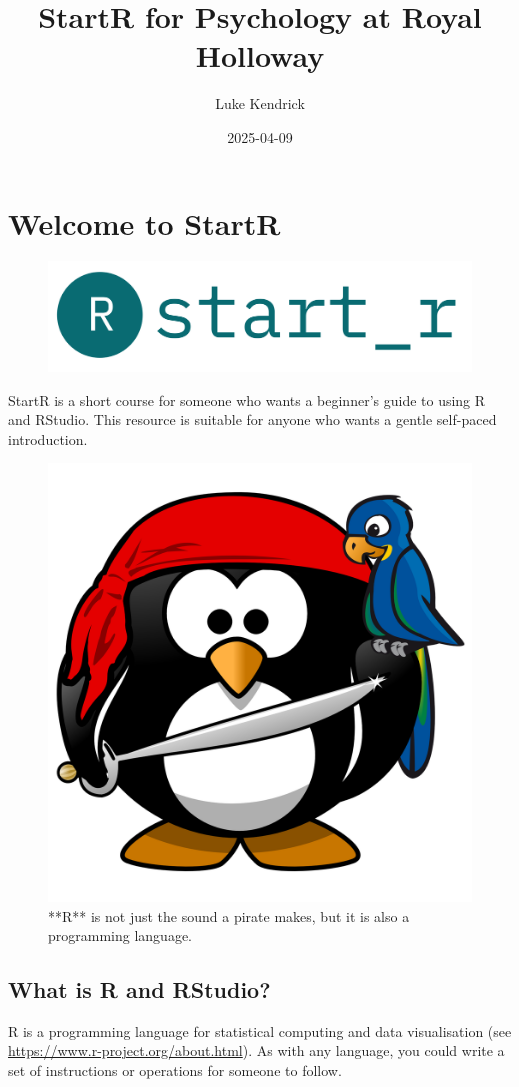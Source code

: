 \documentclass[
]{book}
\title{StartR for Psychology at Royal Holloway}
\author{Luke Kendrick}
\date{2025-04-09}
\let\oldsection\section
\renewcommand{\section}{\needspace{5\baselineskip}\oldsection}
\begin{document}
\maketitle

{
\setcounter{tocdepth}{1}
\tableofcontents
}
\chapter{Welcome to StartR}\label{welcome-to-startr}

\begin{figure}

{\centering \includegraphics[width=0.5\linewidth]{images/startr} 

}

\caption{ }\label{fig:fig}
\end{figure}

StartR is a short course for someone who wants a beginner's guide to using R and RStudio. This resource is suitable for anyone who wants a gentle self-paced introduction.

\begin{figure}

{\centering \includegraphics[width=0.25\linewidth]{images/pirate_spaced} 

}

\caption{**R** is not just the sound a pirate makes, but it is also a programming language.}\label{fig:fig1}
\end{figure}

\section{What is R and RStudio?}\label{what-is-r-and-rstudio}

R is a programming language for statistical computing and data visualisation (see \url{https://www.r-project.org/about.html}). As with any language, you could write a set of instructions or operations for someone to follow.
\end{document}
